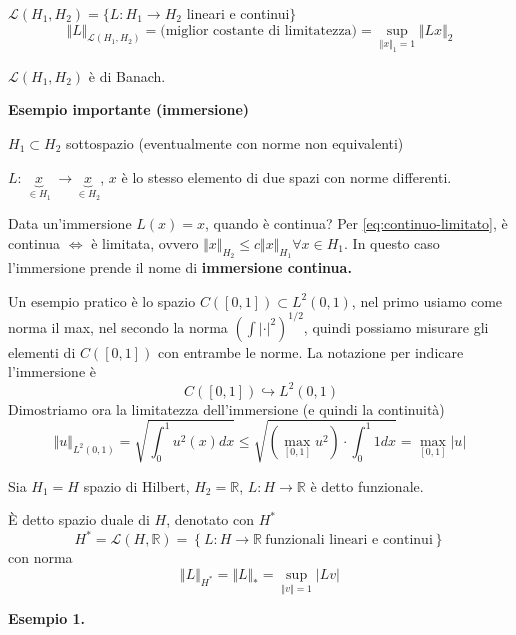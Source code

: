 \documentclass[10pt,a4paper,twoside,openright]{book}
\begin{document}
\begin{definition}
	$\displaystyle \mathcal{L}(H_{1},H_{2}) =\{L:H_{1}\rightarrow H_{2}$ lineari e continui$\displaystyle \}$
	\begin{equation*}
		\Vert L\Vert _{\mathcal{L}(H_{1},H_{2})} =\text{(miglior costante di limitatezza)} =\sup _{\Vert x\Vert _{1} =1}\Vert Lx\Vert _{2}
	\end{equation*}
\end{definition}
\begin{theorem}
	$\displaystyle \mathcal{L}(H_{1},H_{2})$ è di Banach.
\end{theorem}
\textbf{Esempio importante (immersione)}

$\displaystyle H_{1} \subset H_{2}$ sottospazio (eventualmente con norme non equivalenti)

$\displaystyle L:\ \underbrace{x}_{\in H_{1}} \ \rightarrow \underbrace{x}_{\in H_{2}}$, $\displaystyle x$ è lo stesso elemento di due spazi con norme differenti. 

Data un'immersione $\displaystyle L(x) =x$, quando è continua? Per \eqref{eq:continuo-limitato}, è continua $\displaystyle \Leftrightarrow $ è limitata, ovvero $\displaystyle \Vert x\Vert _{H_{2}} \leqslant c\Vert x\Vert _{H_{1}} \forall x\in H_{1}$. In questo caso l'immersione prende il nome di \textbf{immersione continua.}

Un esempio pratico è lo spazio $\displaystyle C([ 0,1]) \subset L^{2}(0,1)$, nel primo usiamo come norma il max, nel secondo la norma $\displaystyle \left(\int | \cdot | ^{2}\right)^{1/2}$, quindi possiamo misurare gli elementi di $\displaystyle C([ 0,1])$ con entrambe le norme. La notazione per indicare l'immersione è
\begin{equation*}
	\ C([ 0,1]) \hookrightarrow L^{2}(0,1)
\end{equation*}
Dimostriamo ora la limitatezza dell'immersione (e quindi la continuità)
\begin{equation*}
	\Vert u\Vert _{L^{2}(0,1)} =\sqrt{\int ^{1}_{0} u^{2}(x) dx} \leqslant \sqrt{\left(\max_{[ 0,1]} u^{2}\right) \cdot \int ^{1}_{0} 1dx} =\max_{[ 0,1]}| u| 
\end{equation*}
\begin{definition}
	[Funzionale] Sia $\displaystyle H_{1} =H$ spazio di Hilbert, $\displaystyle H_{2} =\mathbb{R}$, $\displaystyle L:H\rightarrow \mathbb{R}$ è detto funzionale.
\end{definition}
\begin{definition}
	 È detto spazio duale di $\displaystyle H$, denotato con $\displaystyle H^{*}$
	\begin{equation*}
		H^{*} =\mathcal{L}(H,\mathbb{R}) =\left\{L:H\rightarrow \mathbb{R} \ \text{funzionali lineari e continui}\right\}
	\end{equation*}
	con norma
	\begin{equation*}
		\Vert L\Vert _{H^{*}} =\Vert L\Vert _{*} =\sup _{\Vert v\Vert =1}| Lv| 
	\end{equation*}
\end{definition}
\textbf{Esempio 1.}
\end{document}
